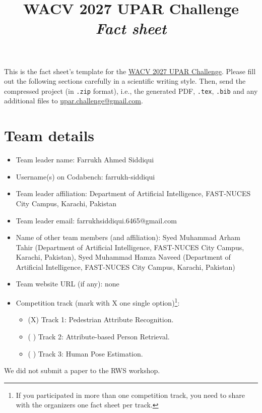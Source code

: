 \documentclass[a4paper, 10pt, conference]{ieeeconf}
\title{WACV 2027 UPAR Challenge\\ \textit{Fact sheet}}
\begin{document}
\maketitle
This is the fact sheet's template for the \href{https://vap.aau.dk/rws/challenge/}{WACV 2027 UPAR Challenge}. Please fill out the following sections carefully in a scientific writing style. Then, send the compressed project (in \texttt{.zip} format), i.e., the generated PDF, \texttt{.tex}, \texttt{.bib} and any additional files to \url{upar.challenge@gmail.com}.
%
%





%
\section{Team details}\label{teamdetails}
\begin{itemize}
    \item Team leader name: Farrukh Ahmed Siddiqui
    \item Username(s) on Codabench: farrukh-siddiqui
    \item Team leader affiliation: Department of Artificial Intelligence, FAST-NUCES City Campus, Karachi, Pakistan
    \item Team leader email: farrukhsiddiqui.6465@gmail.com
    \item Name of other team members (and affiliation): Syed Muhammad Arham Tahir (Department of Artificial Intelligence, FAST-NUCES City Campus, Karachi, Pakistan), Syed Muhammad Hamza Naveed (Department of Artificial Intelligence, FAST-NUCES City Campus, Karachi, Pakistan)
    \item Team website URL (if any): none
    \item Competition track (mark with X one single option)\footnote{If you participated in more than one competition track, you need to share with the organizers one fact sheet per track.}:
    \begin{itemize}
        \item (X) Track 1: Pedestrian Attribute Recognition.
        \item ( ) Track 2: Attribute-based Person Retrieval.
        \item ( ) Track 3: Human Pose Estimation.
    \end{itemize}
\end{itemize}
We did not submit a paper to the RWS workshop.
%
%
\end{document}
